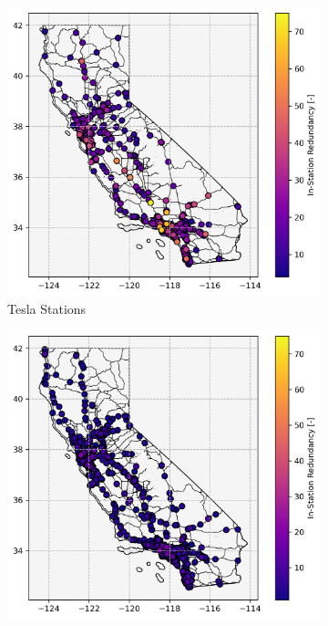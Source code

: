 \begin{figure}[H]
\begin{subfigure}{\linewidth/3}
	\centering
	\includegraphics[width = \linewidth]{figs/California_SNG_T.png}
	\caption{Tesla Stations}
\end{subfigure}%
\begin{subfigure}{\linewidth/3}
	\centering
	\includegraphics[width = \linewidth]{figs/California_SNG_NT.png}

\end{subfigure}
\end{figure}
